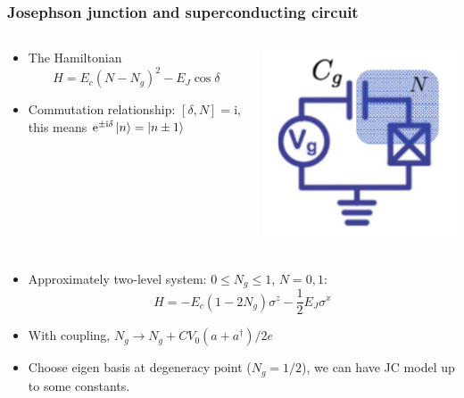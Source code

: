 \documentclass[xcolor=dvipsnames,hyperref={CJKbookmarks=true},aspectratio=169]{beamer}
\newcommand\mi{\mathrm{i}}
\newcommand\e{\mathrm{e}}
\begin{document}
\begin{frame}[t]\frametitle{Josephson junction and superconducting circuit}
\begin{columns}
	\begin{column}{0.75\linewidth}
	\begin{itemize}
		\item The Hamiltonian
		$$
			H = E_c (N-N_g)^2 - E_J\cos\delta
		$$
		\item Commutation relationship: $[\delta, N] = \mi$, this means 
		$\e^{\pm\mi\delta}\ket{n} = \ket{n\pm 1}$
	\end{itemize}
	\end{column}%
	\begin{column}{0.25\linewidth}
	\includegraphics[width=\linewidth]{copper_pair_box.pdf}
	\end{column}
\end{columns}
\begin{itemize}
	\item Approximately two-level system: $0\le N_g \le 1$, $N = 0, 1$: 
	$$
	H = -E_c(1-2N_g) \sigma^z - \frac 12 E_J\sigma^x
	$$
	\item With coupling, $N_g \longrightarrow N_g + CV_0 (a + a^\dag)/2e$
	\item Choose eigen basis at degeneracy point ($N_g = 1/2$), we can have JC 
	model up to some constants. 
\end{itemize}
\end{frame}
\end{document}
